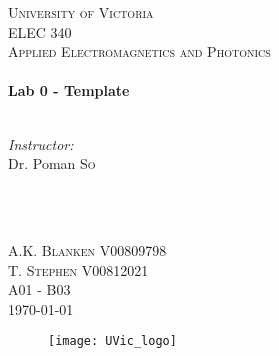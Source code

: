 \begin{titlepage}

\center
 
\textsc{\LARGE University of Victoria}\\[1cm] 	%
\textsc{\Large ELEC 340}\\[0.5cm] 			%
\textsc{\large Applied Electromagnetics and Photonics}\\[0.5cm] 		%


\HRule \\[0.4cm]
{\huge \bfseries Lab 0 - Template}\\[0.2cm] %
\HRule \\[1.5cm]
 
 
\begin{minipage}{0.7\textwidth}
\begin{flushleft} 

\large\emph{Instructor:} \\
Dr. Poman \textsc{So} \\
\vspace{12 pt}

\end{flushleft}
\end{minipage}
~
\begin{minipage}{0.1\textwidth}
\begin{flushright} \large

\vspace{12 pt}

\end{flushright}
\end{minipage}\\[2cm]


\Large A.K. \textsc{Blanken}
\large V00809798 \\
\Large T. \textsc{Stephen}
\large V00812021	\\
A01 - B03\\[1.5cm] 


{\large \today}\\ %

\begin{figure}[b]
	\centering
	\texttt{[image: UVic\_logo]}
\end{figure}

\end{titlepage}
